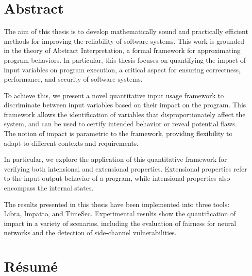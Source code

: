 
\chapter*{Abstract}

The aim of this thesis is to develop mathematically sound and practically efficient methods for improving the reliability of software systems.
This work is grounded in the theory of Abstract Interpretation, a formal framework for approximating program behaviors.
In particular, this thesis focuses on quantifying the impact of input variables on program execution, a critical aspect for ensuring correctness, performance, and security of software systems.

To achieve this, we present a novel quantitative input usage framework to discriminate between input variables based on their impact on the program. This framework allows the identification of variables that disproportionately affect the system, and can be used to certify intended behavior or reveal potential flaws.
The notion of impact is parametric to the framework, providing flexibility to adapt to different contexts and requirements.

In particular, we explore the application of this quantitative framework for verifying both intensional and extensional properties. Extensional properties refer to the input-output behavior of a program, while intensional properties also encompass the internal states.

The results presented in this thesis have been implemented into three tools: Libra, Impatto, and TimeSec.
Experimental results show the quantification of impact in a variety of scenarios, including the evaluation of fairness for neural networks and the detection of side-channel vulnerabilities.

\chapter*{Résumé}

